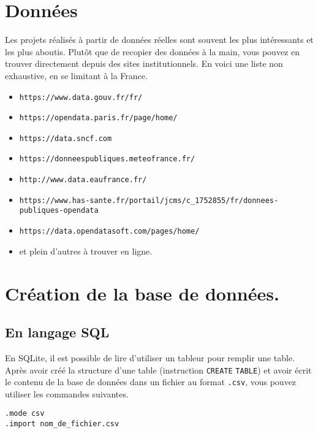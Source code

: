 \section{Données}
Les projets réalisés à partir de données réelles sont souvent les plus intéressants et les plus aboutis.
Plutôt que de recopier des données à la main, vous pouvez en trouver directement depuis des sites institutionnels.
En voici une liste non exhaustive, en se limitant à la France. 
\begin{itemize}
  \item \texttt{https://www.data.gouv.fr/fr/}
  \item \texttt{https://opendata.paris.fr/page/home/}
  \item \texttt{https://data.sncf.com}
  \item \texttt{https://donneespubliques.meteofrance.fr/}
  \item \texttt{http://www.data.eaufrance.fr/}
  \item \texttt{https://www.has-sante.fr/portail/jcms/c\_1752855/fr/donnees-publiques-opendata}
  \item \texttt{https://data.opendatasoft.com/pages/home/}
  \item et plein d'autres à trouver en ligne.
\end{itemize}

\section{Création de la base de données.}

\subsection{En langage SQL}
En SQLite, il est possible de lire d'utiliser un tableur pour remplir une table. 
Après avoir créé la structure d'une table (instruction \texttt{CREATE} \texttt{TABLE}) et avoir écrit le contenu de la base de données dans un fichier au format \texttt{.csv}, vous pouvez utiliser les commandes suivantes. 
\begin{verbatim}
.mode csv
.import nom_de_fichier.csv
\end{verbatim}

